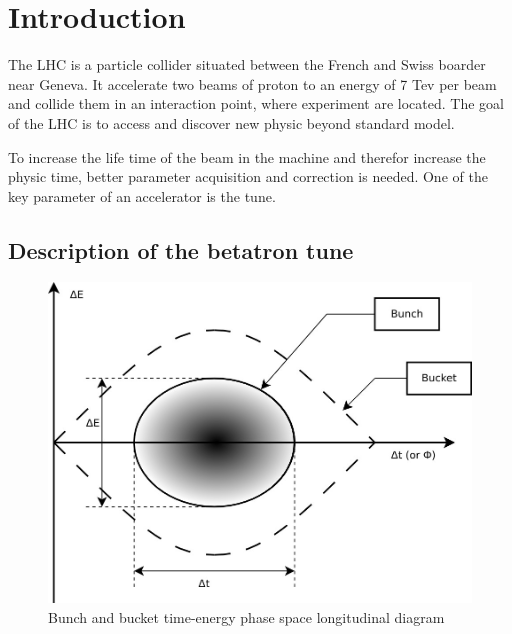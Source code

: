 %


\chapter{Introduction}

The \gls{LHC} is a particle collider situated between the French and Swiss boarder near Geneva. It accelerate two beams of proton to an energy of 7 Tev per beam and collide them in an interaction point, where experiment are located. The goal of the \gls{LHC} is to access and discover new physic beyond standard model.

To increase the life time of the beam in the machine and therefor increase the physic time, better parameter acquisition and correction is needed. One of the key parameter of an accelerator is the \gls{tune}.

\section{Description of the betatron tune}

\begin{figure}[H]
\centering
\caption{Bunch and bucket time-energy phase space longitudinal diagram}
\includegraphics[scale=0.3]{phase_space.jpeg}
\end{figure}

